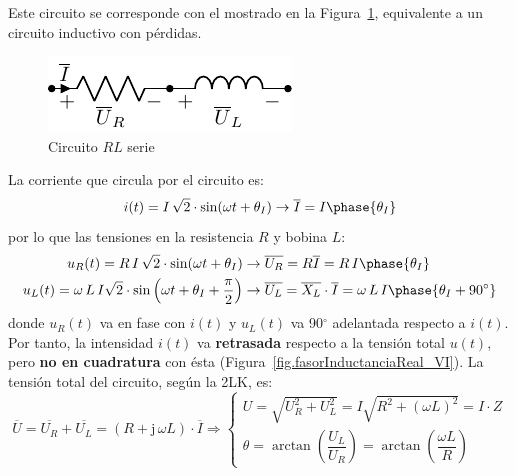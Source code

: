 \documentclass[11pt]{book} %
\begin{document}
	Este circuito se corresponde con el mostrado en la Figura~\ref{fig.RL}, equivalente a un circuito inductivo con pérdidas. 
	\begin{figure}[h]
		\centering
		\includegraphics[width=0.3\linewidth]{../figs/RL.pdf}
		\caption{Circuito $RL$ serie}
		\label{fig.RL}
	\end{figure}
	
	La corriente que circula por el circuito es:
	\begin{equation*}
		i(t)=I\,\sqrt{2}\cdot\sin(\omega t+\theta_I)\rightarrow\overline{I}=I\phase{\theta_I}
	\end{equation*}
	por lo que las tensiones en la resistencia $R$ y bobina $L$:
	\begin{align*}
		u_R(t)=R\, I\,\sqrt{2}\cdot\sin(\omega t+\theta_I)&\rightarrow \overline{U_R} = R \overline{I}=R\,I\phase{\theta_I}\\ 
		u_L(t)= \omega\,L\,I \sqrt{2}\cdot \sin \left(\omega t+\theta_I+\frac{\pi}{2}\right)&\rightarrow \overline{U_L}=\overline{X_L}\cdot\overline{I}= \omega\,L\,I\phase{\theta_I+90^\circ}
	\end{align*}
	donde $u_R(t)$ va en fase con $i(t)$ y $u_L(t)$ va 90$^\circ$ adelantada respecto a $i(t)$. Por tanto, la intensidad $i(t)$ va \textbf{retrasada} respecto a la tensión total $u(t)$, pero \textbf{no en cuadratura} con ésta  (Figura~\ref{fig.fasorInductanciaReal_VI}). La tensión total del circuito, según la 2LK, es:  
	\begin{equation*}
		\overline{U} = \overline{U_R} + \overline{U_L} =(R + \mathrm{j}\,\omega L) \cdot \overline{I}\Rightarrow 
		\begin{cases}
			U=\sqrt{U_R^2+U_L^2}=I\sqrt{R^2+(\omega L)^2}=I\cdot Z\\
			\theta=\arctan\left( \dfrac{U_L}{U_R}\right)=\arctan\left( \dfrac{\omega L}{R}\right)
		\end{cases}
	\end{equation*}
	
\end{document}
